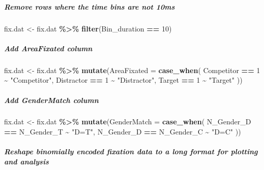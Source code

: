 \documentclass[
]{article}
\newenvironment{Shaded}{\begin{snugshade}}{\end{snugshade}}
\newcommand{\AttributeTok}[1]{\textcolor[rgb]{0.13,0.29,0.53}{#1}}
\newcommand{\DecValTok}[1]{\textcolor[rgb]{0.00,0.00,0.81}{#1}}
\newcommand{\FunctionTok}[1]{\textcolor[rgb]{0.13,0.29,0.53}{\textbf{#1}}}
\newcommand{\NormalTok}[1]{#1}
\newcommand{\OtherTok}[1]{\textcolor[rgb]{0.56,0.35,0.01}{#1}}
\newcommand{\SpecialCharTok}[1]{\textcolor[rgb]{0.81,0.36,0.00}{\textbf{#1}}}
\newcommand{\StringTok}[1]{\textcolor[rgb]{0.31,0.60,0.02}{#1}}
\begin{document}
\subparagraph{Remove rows where the time bins are not
10ms}\label{remove-rows-where-the-time-bins-are-not-10ms}

\begin{Shaded}
\begin{Highlighting}[]
\NormalTok{fix.dat }\OtherTok{\textless{}{-}}\NormalTok{ fix.dat }\SpecialCharTok{\%\textgreater{}\%} \FunctionTok{filter}\NormalTok{(Bin\_duration }\SpecialCharTok{==} \DecValTok{10}\NormalTok{)}
\end{Highlighting}
\end{Shaded}

\subparagraph{Add AreaFixated column}\label{add-areafixated-column}

\begin{Shaded}
\begin{Highlighting}[]
\NormalTok{fix.dat }\OtherTok{\textless{}{-}}\NormalTok{ fix.dat }\SpecialCharTok{\%\textgreater{}\%}
  \FunctionTok{mutate}\NormalTok{(}\AttributeTok{AreaFixated =} \FunctionTok{case\_when}\NormalTok{(}
\NormalTok{    Competitor }\SpecialCharTok{==} \DecValTok{1} \SpecialCharTok{\textasciitilde{}} \StringTok{"Competitor"}\NormalTok{,}
\NormalTok{    Distractor }\SpecialCharTok{==} \DecValTok{1} \SpecialCharTok{\textasciitilde{}} \StringTok{"Distractor"}\NormalTok{,}
\NormalTok{    Target }\SpecialCharTok{==} \DecValTok{1} \SpecialCharTok{\textasciitilde{}} \StringTok{"Target"}
\NormalTok{  ))}
\end{Highlighting}
\end{Shaded}

\subparagraph{Add GenderMatch column}\label{add-gendermatch-column}

\begin{Shaded}
\begin{Highlighting}[]
\NormalTok{fix.dat }\OtherTok{\textless{}{-}}\NormalTok{ fix.dat }\SpecialCharTok{\%\textgreater{}\%}
  \FunctionTok{mutate}\NormalTok{(}\AttributeTok{GenderMatch =} \FunctionTok{case\_when}\NormalTok{(}
\NormalTok{    N\_Gender\_D }\SpecialCharTok{==}\NormalTok{ N\_Gender\_T }\SpecialCharTok{\textasciitilde{}} \StringTok{"D=T"}\NormalTok{,}
\NormalTok{    N\_Gender\_D }\SpecialCharTok{==}\NormalTok{ N\_Gender\_C }\SpecialCharTok{\textasciitilde{}} \StringTok{"D=C"}
\NormalTok{  ))}
\end{Highlighting}
\end{Shaded}

\subparagraph{Reshape binomially encoded fixation data to a long format
for plotting and
analysis}\label{reshape-binomially-encoded-fixation-data-to-a-long-format-for-plotting-and-analysis}
\end{document}
